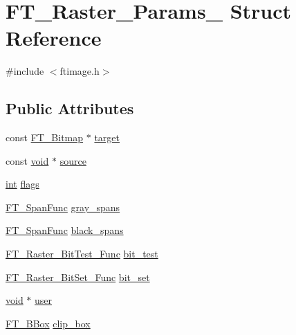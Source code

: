 \hypertarget{struct_f_t___raster___params__}{\section{F\-T\-\_\-\-Raster\-\_\-\-Params\-\_\- Struct Reference}
\label{struct_f_t___raster___params__}
}


{\ttfamily \#include $<$ftimage.\-h$>$}

\subsection*{Public Attributes}
\begin{DoxyCompactItemize}
\item 
const \hyperlink{ftimage_8h_ae28691030f2d16376937cf5e3485f921}{F\-T\-\_\-\-Bitmap} $\ast$ \hyperlink{struct_f_t___raster___params___a2ba8941740db23ec91302aa9bd154da3}{target}
\item 
const \hyperlink{wglew_8h_aeea6e3dfae3acf232096f57d2d57f084}{void} $\ast$ \hyperlink{struct_f_t___raster___params___a9be95865384791b018f7a9665a062ee5}{source}
\item 
\hyperlink{wglew_8h_a500a82aecba06f4550f6849b8099ca21}{int} \hyperlink{struct_f_t___raster___params___a1a28ab69b8296b4378886d1a2b57d333}{flags}
\item 
\hyperlink{ftimage_8h_ac32cc8b13e9997d7b8919ebe935bc9d6}{F\-T\-\_\-\-Span\-Func} \hyperlink{struct_f_t___raster___params___a456191f1944775933e3d9d36c8632c35}{gray\-\_\-spans}
\item 
\hyperlink{ftimage_8h_ac32cc8b13e9997d7b8919ebe935bc9d6}{F\-T\-\_\-\-Span\-Func} \hyperlink{struct_f_t___raster___params___a42c30e60ad5e243cf78833232e052b47}{black\-\_\-spans}
\item 
\hyperlink{ftimage_8h_a3e98d245bd714c01211ad8418fd7c8a9}{F\-T\-\_\-\-Raster\-\_\-\-Bit\-Test\-\_\-\-Func} \hyperlink{struct_f_t___raster___params___aff3c1a2a7eda24136a46715128d24ed6}{bit\-\_\-test}
\item 
\hyperlink{ftimage_8h_ad99ef5f63845d64ad557ad8ab265f09e}{F\-T\-\_\-\-Raster\-\_\-\-Bit\-Set\-\_\-\-Func} \hyperlink{struct_f_t___raster___params___ac66c3c44fcb63c254a46170d85d653c0}{bit\-\_\-set}
\item 
\hyperlink{wglew_8h_aeea6e3dfae3acf232096f57d2d57f084}{void} $\ast$ \hyperlink{struct_f_t___raster___params___af78bac59f93c989840bbcbcbefd77c55}{user}
\item 
\hyperlink{ftimage_8h_ae341c4eb5a7199947a13b2a1dcaf7af7}{F\-T\-\_\-\-B\-Box} \hyperlink{struct_f_t___raster___params___ab32f75f19d9cacb20e410886c055e306}{clip\-\_\-box}
\end{DoxyCompactItemize}


